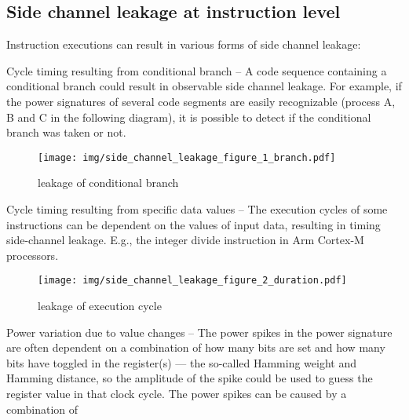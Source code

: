 \documentclass[a4paper,]{report}
\makeatletter
\newcounter{figno}
\newenvironment{fignos:no-prefix-figure-caption}{
  \caption@ifcompatibility{}{
    \let\oldthefigure\thefigure
    \let\oldtheHfigure\theHfigure
    \renewcommand{\thefigure}{figno:\thefigno}
    \renewcommand{\theHfigure}{figno:\thefigno}
    \stepcounter{figno}
    \captionsetup{labelformat=empty}
  }
}{
  \caption@ifcompatibility{}{
    \captionsetup{labelformat=default}
    \let\thefigure\oldthefigure
    \let\theHfigure\oldtheHfigure
    \addtocounter{figure}{-1}
  }
}
\makeatother
\begin{document}
\hypertarget{side-channel-leakage-at-instruction-level}{%
\subsection{Side channel leakage at instruction
level}\label{side-channel-leakage-at-instruction-level}}

Instruction executions can result in various forms of side channel
leakage:

Cycle timing resulting from conditional branch -- A code sequence
containing a conditional branch could result in observable side channel
leakage. For example, if the power signatures of several code segments
are easily recognizable (process A, B and C in the following diagram),
it is possible to detect if the conditional branch was taken or not.

\begin{fignos:no-prefix-figure-caption}

\begin{figure}
\centering
\texttt{[image: img/side\_channel\_leakage\_figure\_1\_branch.pdf]}
\caption{leakage of conditional branch}
\end{figure}

\end{fignos:no-prefix-figure-caption}

Cycle timing resulting from specific data values -- The execution cycles
of some instructions can be dependent on the values of input data,
resulting in timing side-channel leakage. E.g., the integer divide
instruction in Arm Cortex-M processors.

\begin{fignos:no-prefix-figure-caption}

\begin{figure}
\centering
\texttt{[image: img/side\_channel\_leakage\_figure\_2\_duration.pdf]}
\caption{leakage of execution cycle}
\end{figure}

\end{fignos:no-prefix-figure-caption}

Power variation due to value changes -- The power spikes in the power
signature are often dependent on a combination of how many bits are set
and how many bits have toggled in the register(s) --- the so-called
Hamming weight and Hamming distance, so the amplitude of the spike could
be used to guess the register value in that clock cycle. The power
spikes can be caused by a combination of
\end{document}
